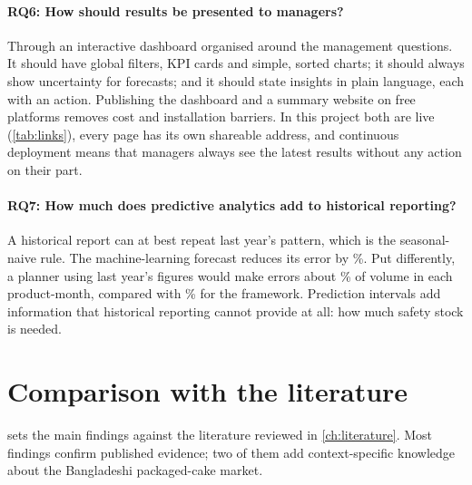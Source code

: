 \paragraph{RQ6: How should results be presented to managers?}
Through an interactive dashboard organised around the management questions. It should have global filters,
KPI cards and simple, sorted charts; it should always show uncertainty for forecasts; and it should state
insights in plain language, each with an action. Publishing the dashboard and a summary website on free
platforms removes cost and installation barriers. In this project both are live (\cref{tab:links}), every page
has its own shareable address, and continuous deployment means that managers always see the latest results
without any action on their part.

\paragraph{RQ7: How much does predictive analytics add to historical reporting?}
A historical report can at best repeat last year's pattern, which is the seasonal-naive rule. The
machine-learning forecast reduces its error by \GainVsSNaive\%. Put differently, a planner using last year's
figures would make errors about \SNaiveWAPE\% of volume in each product-month, compared with \BestRegWAPE\% for
the framework. Prediction intervals add information that historical reporting cannot provide at all: how much
safety stock is needed.

\section{Comparison with the literature}
 sets the main findings against the literature reviewed in \cref{ch:literature}. Most
findings confirm published evidence; two of them add context-specific knowledge about the Bangladeshi
packaged-cake market.

